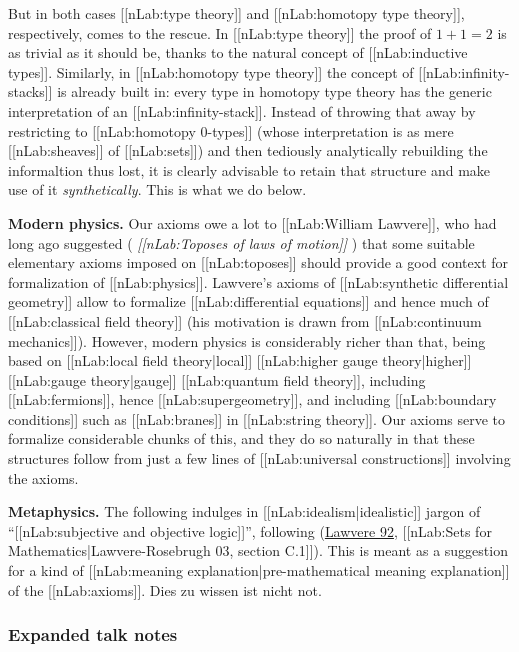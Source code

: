\documentclass[12pt,titlepage]{article}
\theoremstyle{plain}
\theoremstyle{definition}
\theoremstyle{remark}
\begin{document}
But in both cases [[nLab:type theory]] and [[nLab:homotopy type theory]], respectively, comes to the rescue. In [[nLab:type theory]] the proof of $1+1 = 2$ is as trivial as it should be, thanks to the natural concept of [[nLab:inductive types]]. Similarly, in [[nLab:homotopy type theory]] the concept of [[nLab:infinity-stacks]] is already built in: every type in homotopy type theory has the generic interpretation of an [[nLab:infinity-stack]]. Instead of throwing that away by restricting to [[nLab:homotopy 0-types]] (whose interpretation is as mere [[nLab:sheaves]] of [[nLab:sets]]) and then tediously analytically rebuilding the informaltion thus lost, it is clearly advisable to retain that structure and make use of it \emph{synthetically}. This is what we do below.

\textbf{Modern physics.} Our axioms owe a lot to [[nLab:William Lawvere]], who had long ago suggested ( \emph{[[nLab:Toposes of laws of motion]]} ) that some suitable elementary axioms imposed on [[nLab:toposes]] should provide a good context for formalization of [[nLab:physics]]. Lawvere's axioms of [[nLab:synthetic differential geometry]] allow to formalize [[nLab:differential equations]] and hence much of [[nLab:classical field theory]] (his motivation is drawn from [[nLab:continuum mechanics]]). However, modern physics is considerably richer than that, being based on [[nLab:local field theory|local]] [[nLab:higher gauge theory|higher]] [[nLab:gauge theory|gauge]] [[nLab:quantum field theory]], including [[nLab:fermions]], hence [[nLab:supergeometry]], and including [[nLab:boundary conditions]] such as [[nLab:branes]] in [[nLab:string theory]]. Our axioms serve to formalize considerable chunks of this, and they do so naturally in that these structures follow from just a few lines of [[nLab:universal constructions]] involving the axioms.

\textbf{Metaphysics.} The following indulges in [[nLab:idealism|idealistic]] jargon of ``[[nLab:subjective and objective logic]]'', following (\href{http://ncatlab.org/nlab/show/objective+and+subjective+logic#Lawvere92}{Lawvere 92}, [[nLab:Sets for Mathematics|Lawvere-Rosebrugh 03, section C.1]]). This is meant as a suggestion for a kind of [[nLab:meaning explanation|pre-mathematical meaning explanation]] of the [[nLab:axioms]]. Dies zu wissen ist nicht not.

\hypertarget{expanded_talk_notes}{}\subsubsection*{{Expanded talk notes}}\label{expanded_talk_notes}
\end{document}
